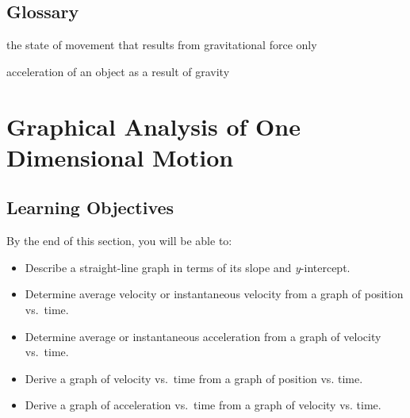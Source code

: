 \documentclass[
]{book}
\providecommand{\tightlist}{%
  \setlength{\itemsep}{0pt}\setlength{\parskip}{0pt}}
\newenvironment{learning-objectives}{}{}
\begin{document}
\hypertarget{glossary-4}{%
\subsection{Glossary}\label{glossary-4}}

\begin{description}
\tightlist
\item[free-fall]
the state of movement that results from gravitational force only
\end{description}

\begin{description}
\tightlist
\item[acceleration due to gravity]
acceleration of an object as a result of gravity
\end{description}

\hypertarget{graphical-analysis-of-one-dimensional-motion}{%
\section{Graphical Analysis of One Dimensional Motion}\label{graphical-analysis-of-one-dimensional-motion}}

\hypertarget{fs-id1367279}{}
\begin{learning-objectives}

\hypertarget{learning-objectives-6}{%
\subsection{Learning Objectives}\label{learning-objectives-6}}

By the end of this section, you will be able to:

\begin{itemize}
\tightlist
\item
  Describe a straight-line graph in terms of its slope and
  \emph{y}-intercept.
\item
  Determine average velocity or instantaneous velocity from a graph of
  position vs.~time.
\item
  Determine average or instantaneous acceleration from a graph of
  velocity vs.~time.
\item
  Derive a graph of velocity vs.~time from a graph of position vs.
  time.
\item
  Derive a graph of acceleration vs.~time from a graph of velocity vs.
  time.
\end{itemize}

\end{learning-objectives}
\end{document}
